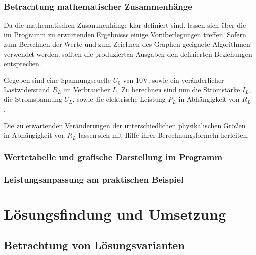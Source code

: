 \documentclass{article}
\begin{document}
    \subsubsection{Betrachtung mathematischer Zusammenhänge}
    Da die mathematischen Zusammenhänge klar definiert sind, lassen sich über die im Programm zu erwartenden Ergebnisse einige Vorüberlegungen treffen.
    Sofern zum Berechnen der Werte und zum Zeichnen des Graphen geeignete Algorithmen verwendet werden, sollten die produzierten Ausgaben den definierten Beziehungen entsprechen.

    Gegeben sind eine Spannungsquelle $U_0$ von $10 \si{\volt}$, sowie ein veränderlicher Lastwiderstand $R_L$ im Verbraucher $L$.
    Zu berechnen sind nun die Stromstärke $I_L$, die Stromspannung $U_L$, sowie die elektrische Leistung $P_L$ in Abhängigkeit von $R_L$.

    Die zu erwartenden Veränderungen der unterschiedlichen physikalischen Größen in Abhängigkeit von $R_L$ lassen sich mit Hilfe ihrer Berechnungsformeln herleiten.

    \subsubsection{Wertetabelle und grafische Darstellung im Programm}

    \subsubsection{Leistungsanpassung am praktischen Beispiel}

\newpage
\section{Lösungsfindung und Umsetzung}

\subsection{Betrachtung von Lösungsvarianten}
\end{document}
